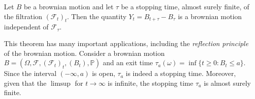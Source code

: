 \begin{theorem}
    Let $B$ be a brownian motion and let $\tau$ be a stopping time, almost surely finite, of the filtration $(\mathcal{F}_t)_t$. Then the quantity $Y_t = B_{t+\tau}-B_{\tau}$ is a brownian motion independent of $\mathcal{F}_{\tau}$. 
\end{theorem}

This theorem has many important applications, including the \textit{reflection principle} of the brownian motion. Consider a brownian motion $B = (\Omega, \mathcal{F}, (\mathcal{F}_t)_t, (B_t), \mathbb{P})$ and an exit time $\tau_a(\omega) = \inf \{ t \geq 0 : B_t \leq a \}$. Since the interval $(-\infty,a)$ is open,  $\tau_a$ is indeed a stopping time. Moreover, given that the $\limsup$ for $t \to \infty$ is infinite, the stopping time $\tau_a$ is almost surely finite. 

